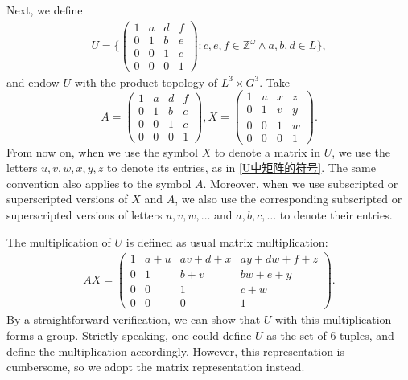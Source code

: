 \documentclass[11pt]{amsart}
\theoremstyle{definition}
\theoremstyle{remark}
\numberwithin{equation}{section}
\def\Z {{\mathbb{Z}}}
\begin{document}
Next, we define
\begin{align*}
    U=\Bigg\{
        \begin{pmatrix}
            1 & a & d & f\\
            0 & 1 & b & e\\
            0 & 0 & 1 & c\\
            0 & 0 & 0 & 1
        \end{pmatrix}:c,e,f\in\Z^\omega\wedge a,b,d\in L
    \Bigg\},
\end{align*}
and endow $U$ with the product topology of $L^3\times G^3$. Take
\begin{equation}\label{U中矩阵的符号}
    A=\begin{pmatrix}
        1 & a & d & f\\
        0 & 1 & b & e\\
        0 & 0 & 1 & c\\
        0 & 0 & 0 & 1
    \end{pmatrix},
    X=\begin{pmatrix}
        1 & u & x & z\\
        0 & 1 & v & y\\
        0 & 0 & 1 & w\\
        0 & 0 & 0 & 1
    \end{pmatrix}.
\end{equation}
From now on, when we use the symbol $X$ to denote a matrix in $U$, we use the letters $u,v,w,x,y,z$ to denote its entries, as in \eqref{U中矩阵的符号}. The same convention also applies to the symbol $A$. Moreover, when we use subscripted or superscripted versions of  $X$ and $A$, we also use the corresponding subscripted or superscripted versions of letters $u,v,w,\dots$ and $a,b,c,\dots$ to denote their entries.

The multiplication of $U$ is defined as usual matrix multiplication:
\begin{align*}
    AX=\begin{pmatrix}
        1 & a+u & a v + d + x & a y + d w + f + z\\
        0 & 1 & b+v & b w + e + y\\
        0 & 0 & 1 & c + w\\
        0 & 0 & 0 & 1
    \end{pmatrix}.
\end{align*}
By a straightforward verification, we can show that $U$ with this multiplication forms a group. Strictly speaking, one could define $U$  as the set of $6$-tuples, and define the multiplication accordingly. However, this representation is cumbersome, so we adopt the matrix representation instead.
\end{document}
